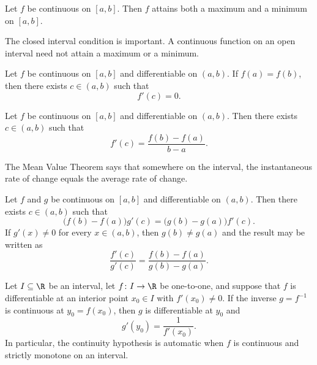     \begin{theorem}
        Let $f$ be continuous on $[a,b]$. Then $f$ attains both a maximum and
        a minimum on $[a,b]$.
    \end{theorem}

    \begin{remark}
        The closed interval condition is important. A continuous function on an
        open interval need not attain a maximum or a minimum.
    \end{remark}

    \begin{theorem}
        Let $f$ be continuous on $[a,b]$ and differentiable on $(a,b)$. If
        $f(a)=f(b)$, then there exists $c\in(a,b)$ such that
        \[
            f'(c)=0.
        \]
    \end{theorem}

    \begin{theorem}
        Let $f$ be continuous on $[a,b]$ and differentiable on $(a,b)$. Then
        there exists $c\in(a,b)$ such that
        \[
            f'(c)
            =
            \frac{f(b)-f(a)}{b-a}.
        \]
    \end{theorem}

    \begin{idea}
        The Mean Value Theorem says that somewhere on the interval, the
        instantaneous rate of change equals the average rate of change.
    \end{idea}

    \begin{theorem}
        Let $f$ and $g$ be continuous on $[a,b]$ and differentiable on
        $(a,b)$. Then there exists $c\in(a,b)$ such that
        \[
            \bigl(f(b)-f(a)\bigr)g'(c)
            =
            \bigl(g(b)-g(a)\bigr)f'(c).
        \]
        If $g'(x)\neq 0$ for every $x\in(a,b)$, then $g(b)\neq g(a)$
        and the result may be written as
        \[
            \frac{f'(c)}{g'(c)}
            =
            \frac{f(b)-f(a)}{g(b)-g(a)}.
        \]
    \end{theorem}

    \begin{theorem}
        Let $I\subseteq\R$ be an interval, let $f\colon I\to\R$ be one-to-one, and
        suppose that $f$ is differentiable at an interior point $x_0\in I$ with
        $f'(x_0)\neq0$. If the inverse $g=f^{-1}$ is continuous at
        $y_0=f(x_0)$, then $g$ is differentiable at $y_0$ and
        \[
            g'(y_0)=\frac{1}{f'(x_0)}.
        \]
        In particular, the continuity hypothesis is automatic when $f$ is
        continuous and strictly monotone on an interval.
    \end{theorem}

